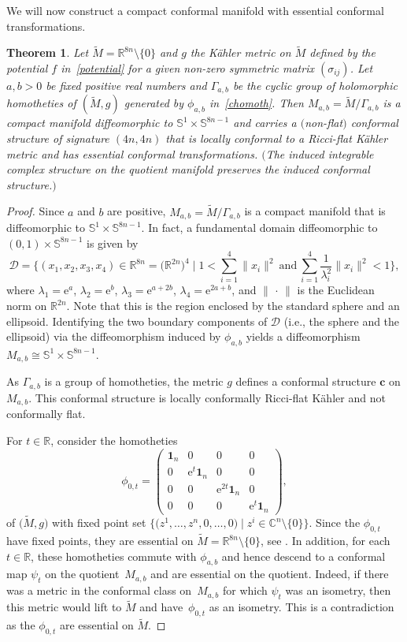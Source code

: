 \documentclass[pdftex]{sigma}
\numberwithin{equation}{section}
\newtheorem{Theorem}{Theorem}[section]
\newcommand{\C}{\ensuremath{\mathbb{C}}}
\renewcommand{\SS}{\ensuremath{\mathbb{S}}}
\newcommand{\1}{\mathbf{1}}
\newcommand{\e}{\mathrm{e}}
\newcommand{\btheo}{\begin{Theorem}}
\newcommand{\etheo}{\end{Theorem}}
\newcommand{\bprf}{\begin{proof}}
\newcommand{\rr}{\mathbb{R}}
\newcommand{\+}{\oplus}
\newcommand{\tM}{\widetilde{M}}
\renewcommand{\=}{\equiv}
\newcommand{\R}{\mathbb{R}}
\begin{document}
We will now construct a compact conformal manifold with essential conformal transformations.

\btheo\label{main:thm}
Let $\tM=\rr^{8n}\setminus\{0\}$ and $g$ the K\"ahler metric on $\tM$ defined by the potential $f$ in~\eqref{potential} for a given non-zero symmetric matrix $(\sigma_{ij})$.
Let $a,b>0$ be fixed positive real numbers and $\Gamma_{a,b} $ be the cyclic group of {holomorphic} homotheties of $(\tM,g)$ generated by $\phi_{a,b}$ in~\eqref{chomoth}. Then
$M_{a,b}=\tM/\Gamma_{a,b}$ is a compact manifold diffeomorphic to $\SS^1\times \SS^{8n-1}$ and carries a $($non-flat$)$ conformal structure of signature $(4n,4n)$ that is locally conformal to a Ricci-flat K\"ahler metric and has essential conformal transformations.
$($The induced integrable complex structure on the quotient manifold preserves the induced conformal structure.$)$
\etheo
\bprf

Since $a$ and $b$ are positive, $M_{a,b}=\tM/\Gamma_{a,b}$ is a compact manifold that is diffeomorphic to $\SS^1\times \SS^{8n-1}$.
In fact, a fundamental domain diffeomorphic to $(0,1)\times \SS^{8n-1}$ is given by
\[ \mathcal D = \Biggl\{ (x_1,x_2,x_3,x_4) \in \mathbb{R}^{8n} = \bigl(\mathbb{R}^{2n}\bigr)^4 \mid 1< \sum_{i=1}^4 \|x_i\|^2 \  \mbox{and}\
\sum_{i=1}^4 \frac{1}{\lambda_i^2} \|x_i\|^2<1\Biggr\},\]
 where $\lambda_1 = \e^a$, $\lambda_2 = \e^b$, $\lambda_3 = \e^{a+2b}$, $\lambda_4 = \e^{2a+b}$, and $\|\, \cdot\,\|$ is the Euclidean norm on $\R^{2n}$.
 Note that this is the region enclosed by the standard sphere and an ellipsoid. Identifying the two
 boundary components of $\mathcal D$ (i.e., the sphere and the ellipsoid) via the diffeomorphism induced by $\phi_{a,b}$ yields a diffeomorphism $M_{a,b} \cong \SS^1\times \SS^{8n-1}$.

{As} $\Gamma_{a,b}$ is a group of homotheties, the metric $g$ defines a conformal structure $\mathbf{c}$ on {$M_{a,b}$.} This conformal structure is locally conformally Ricci-flat K\"ahler and not conformally flat.

For $t\in \rr$, consider the homotheties
\[\phi_{0,t}=
\begin{pmatrix} \1_{n} &0&0&0\\ 0& \e^{t} \1_{n}&0&0 \\
0&0& \e^{2t} \1_{n}&0\\
0&0&0&\e^{t}\1_{n}
\end{pmatrix},
\]
of $\bigl(\tM,g\bigr)$ with fixed point set $\bigl\{\bigl(z^1,\ldots , z^n,0,\ldots, 0\bigr)\mid z^i \in \C^n\setminus \{0\}\bigr\}$. Since the $\phi_{0,t}$ have fixed points, they are essential on $\tM=\rr^{8n}\setminus\{0\}$, see \cite[Proposition 2.5]{LeistnerTeisseire22}.
In addition, for each~${t\in \rr}$, these homotheties commute with $\phi_{a,b}$ and hence descend to a conformal map $\psi_t$ on the quotient~$M_{a,b}$ and are essential on the quotient. Indeed, if there was a metric in the conformal class on~$M_{a,b}$ for which $\psi_t$ {was} an isometry, then this metric would lift to $\tM$ and have~$\phi_{0,t}$ as an isometry. This is a contradiction as the $\phi_{0,t}$ are essential on $\tM$.
\end{proof}
\end{document}
